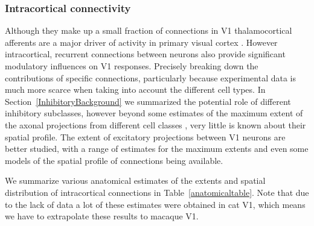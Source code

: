 \subsubsection*{Intracortical connectivity}

Although they make up a small fraction of connections in V1
thalamocortical afferents are a major driver of activity in primary
visual cortex \citep{Binzegger2004}. However intracortical, recurrent
connections between neurons also provide significant modulatory
influences on V1 responses. Precisely breaking down the contributions
of specific connections, particularly because experimental data is
much more scarce when taking into account the different cell types. In
Section~\ref{InhibitoryBackground} we summarized the potential role of
different inhibitory subclasses, however beyond some estimates of the
maximum extent of the axonal projections from different cell classes
\citep{Kisvarday1993, Kisvarday1997a, Budd2001, Buzas2001}, very
little is known about their spatial profile. The extent of excitatory
projections between V1 neurons are better studied, with a range of
estimates for the maximum extents \citep{Angelucci2002} and even some
models of the spatial profile of connections \citep{Buzas2006} being
available.

We summarize various anatomical estimates of the extents and spatial
distribution of intracortical connections in
Table~\ref{anatomicaltable}. Note that due to the lack of data a lot
of these estimates were obtained in cat V1, which means we have to
extrapolate these results to macaque V1.

